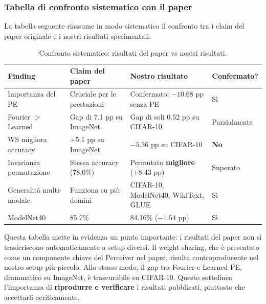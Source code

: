 \documentclass[12pt,a4paper]{article}
\begin{document}
\subsubsection{Tabella di confronto sistematico con il paper}

La tabella seguente riassume in modo sistematico il confronto tra i claim del paper originale e i nostri risultati sperimentali.

\begin{table}[htbp]
\centering
\caption{Confronto sistematico: risultati del paper vs nostri risultati.}
\label{tab:confronto_paper_nostro}
\small
\begin{tabular}{@{}p{3cm}p{3.5cm}p{3.5cm}l@{}}
\toprule
\textbf{Finding} & \textbf{Claim del paper} & \textbf{Nostro risultato} & \textbf{Confermato?} \\
\midrule
Importanza del PE & Cruciale per le prestazioni & Confermato: $-10.68$ pp senza PE & S\`i \\
\addlinespace
Fourier $>$ Learned & Gap di 7.1 pp su ImageNet & Gap di soli 0.52 pp su CIFAR-10 & Parzialmente \\
\addlinespace
WS migliora accuracy & +5.1 pp su ImageNet & $-5.36$ pp su CIFAR-10 & \textbf{No} \\
\addlinespace
Invarianza permutazione & Stessa accuracy (78.0\%) & Permutato \textbf{migliore} (+8.43 pp) & Superato \\
\addlinespace
Generalit\`a multi-modale & Funziona su pi\`u domini & CIFAR-10, ModelNet40, WikiText, GLUE & S\`i \\
\addlinespace
ModelNet40 & 85.7\% & 84.16\% ($-1.54$ pp) & S\`i \\
\bottomrule
\end{tabular}
\end{table}

Questa tabella mette in evidenza un punto importante: i risultati del paper non si trasferiscono automaticamente a setup diversi. Il weight sharing, che \`e presentato come un componente chiave del Perceiver nel paper, risulta controproducente nel nostro setup pi\`u piccolo. Allo stesso modo, il gap tra Fourier e Learned PE, drammatico su ImageNet, \`e trascurabile su CIFAR-10. Questo sottolinea l'importanza di \textbf{riprodurre e verificare} i risultati pubblicati, piuttosto che accettarli acriticamente.
\end{document}
